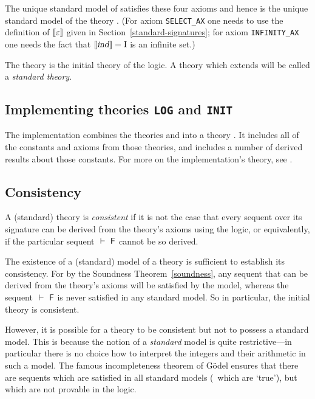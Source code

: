 The unique standard model of  satisfies these four axioms
and hence is the unique standard model of the theory
. (For axiom
{\small\tt SELECT\_AX} one needs to use the definition of
$[\![\varepsilon]\!]$ given in Section~\ref{standard-signatures}; for axiom
{\small\tt INFINITY\_AX} one needs the fact that $[\![\textsl{ind}]\!]=\mbox{\rm I}$ is
an infinite set.)

The theory  is the initial theory of the
\HOL{} logic. A theory which extends  will be called a
{\em standard theory}.

\subsection{Implementing theories \texttt{LOG} and \texttt{INIT}}
\label{sec:implementing-log-init}

The implementation combines the theories  and
 into a theory .  It includes all of the
constants and axioms from those theories, and includes a number of
derived results about those constants.  For more on the
implementation's  theory, see \DESCRIPTION.

\subsection{Consistency}
\label{consistency}

A (standard) theory is {\em consistent\/} if
it is not the case that every sequent over its signature can be
derived from the theory's axioms using the \HOL{} logic, or
equivalently, if the particular sequent $\ \vdash\ {\sf F}$ cannot be so derived.

The existence of a (standard) model of a theory is sufficient to
establish its consistency. For by the Soundness
Theorem~\ref{soundness}, any sequent that can be derived from the
theory's axioms will be satisfied by the model, whereas the sequent
$\ \vdash\ {\sf F}$ is never satisfied in any standard model.  So in particular,
the initial theory  is consistent.

However, it is possible for a theory to be consistent but not to
possess a standard model. This is because the notion of a {\em
standard\/} model is quite restrictive---in particular there is no
choice how to interpret the integers and their arithmetic in such a
model. The famous incompleteness theorem of G\"odel ensures that there
are sequents which are satisfied in all standard models (\ie\ which are
`true'), but which are not provable in the \HOL{} logic.





